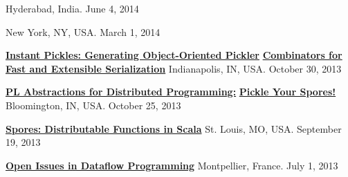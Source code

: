 \documentclass[9pt]{article}
\begin{document}
 \vspace{-0.03in}
\linebreak{}\dates{}
\linebreak\noindent Hyderabad, India. June 4, 2014
\bigskip

 \vspace{-0.03in}
\linebreak{}\dates{}
\linebreak\noindent New York, NY, USA. March 1, 2014
\bigskip

\noindent\href{https://speakerdeck.com/heathermiller/instant-pickles-generating-object-oriented-pickler-combinators-for-fast-and-extensible-serialization}{\bf Instant Pickles: Generating Object-Oriented Pickler} \vspace{-0.03in}
\linebreak\noindent\href{https://speakerdeck.com/heathermiller/instant-pickles-generating-object-oriented-pickler-combinators-for-fast-and-extensible-serialization}{\bf Combinators for Fast and Extensible Serialization}\dates{}
\linebreak\noindent Indianapolis, IN, USA. October 30, 2013
\bigskip

\noindent\href{http://heather.miller.am/files/IU-PL-Abstractions-for-Dist-Programming.pdf}{\bf PL Abstractions for Distributed Programming:} \vspace{-0.03in}
\linebreak\noindent\href{http://heather.miller.am/files/IU-PL-Abstractions-for-Dist-Programming.pdf}{\bf Pickle Your Spores!}\dates{}
\linebreak\noindent Bloomington, IN, USA. October 25, 2013
\bigskip

\noindent\href{https://speakerdeck.com/heathermiller/spores-distributable-functions-in-scala}{\bf Spores: Distributable Functions in Scala} 
\linebreak\noindent St. Louis, MO, USA. September 19, 2013
\bigskip

\noindent\href{http://heather.miller.am/files/LaME2013-Dataflow.pdf}{\bf Open Issues in Dataflow Programming} 
\linebreak\noindent Montpellier, France. July 1, 2013
\bigskip
\end{document}
